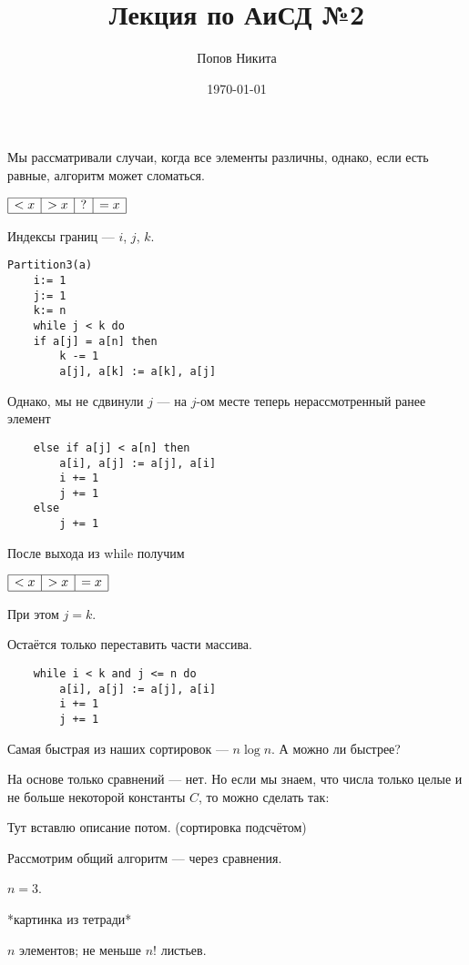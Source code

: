 \documentclass[11pt,a4paper]{article}
\title{Лекция по АиСД №2}
\date{\today}
\author{Попов Никита}
\begin{document}
\maketitle

Мы рассматривали случаи, когда все элементы различны, однако, если есть равные, алгоритм может сломаться.

$\begin{array}{|c|c|c|c|}
    \hline
    <x&>x&?&=x\\
    \hline
\end{array}$

Индексы границ --- $i$, $j$, $k$.
\begin{lstlisting}
Partition3(a)
    i:= 1
    j:= 1
    k:= n
    while j < k do
    if a[j] = a[n] then
        k -= 1
        a[j], a[k] := a[k], a[j]
\end{lstlisting}
\hspace{1.8cm}Однако, мы не сдвинули $j$ --- на $j$-ом месте теперь нерассмотренный ранее элемент
\begin{lstlisting}
    else if a[j] < a[n] then
        a[i], a[j] := a[j], a[i]
        i += 1
        j += 1
    else
        j += 1
\end{lstlisting}

После выхода из while получим

$\begin{array}{|c|c|c|c|}
    \hline
    <x&>x&=x\\
    \hline
\end{array}$

При этом $j = k$.

Остаётся только переставить части массива.

\begin{lstlisting}
    while i < k and j <= n do
        a[i], a[j] := a[j], a[i]
        i += 1
        j += 1
\end{lstlisting}

Самая быстрая из наших сортировок --- $n \log n$. А можно ли быстрее?

На основе только сравнений --- нет. Но если мы знаем, что числа только целые и не больше некоторой константы $C$, то можно сделать так:

Тут вставлю описание потом. (сортировка подсчётом)

Рассмотрим общий алгоритм --- через сравнения.

$n = 3$.

*картинка из тетради*

$n$ элементов; не меньше $n!$ листьев.
\end{document}
